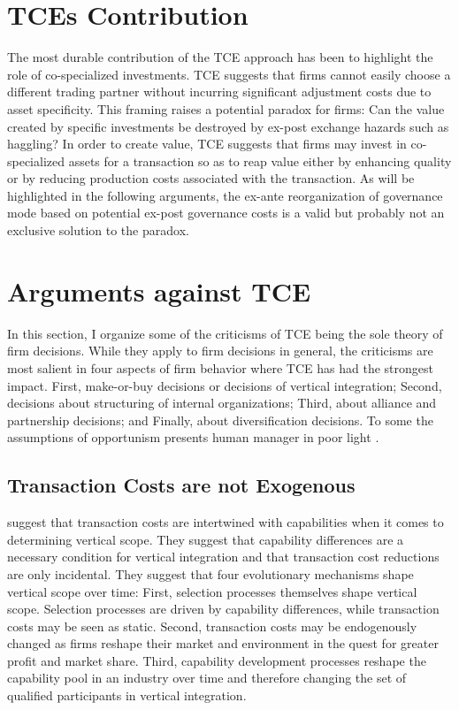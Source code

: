\documentclass[12pt,letterpaper]{article}
\begin{document}
\section{TCE\textquotesingle s Contribution}
The most durable contribution of the TCE approach has been to highlight the role of co-specialized investments. TCE suggests that firms cannot easily choose a different trading partner without incurring significant adjustment costs due to asset specificity. This framing raises a potential paradox for firms: Can the value created by specific investments be destroyed by ex-post exchange hazards such as haggling? In order to create value, TCE suggests that firms may invest in co-specialized assets for a transaction so as to reap value either by enhancing quality or by reducing production costs associated with the transaction. As will be highlighted in the following arguments, the ex-ante reorganization of governance mode based on potential ex-post governance costs is a valid but probably not an exclusive solution to the paradox.

\section{Arguments against TCE}
In this section, I organize some of the criticisms of TCE being the sole theory of firm decisions. While they apply to firm decisions in general, the criticisms are most salient in four aspects of firm behavior where TCE has had the strongest impact. First, make-or-buy decisions or decisions of vertical integration; Second, decisions about structuring of internal organizations; Third, about alliance and partnership decisions; and Finally, about diversification decisions. To some the assumptions of opportunism presents human manager in poor light \citep{Ghoshal1996}.

\subsection{Transaction Costs are not Exogenous}
\cite{Jacobides2005a} suggest that transaction costs are intertwined with capabilities when
it comes to determining vertical scope. They suggest that capability differences are a necessary
condition for vertical integration and that transaction cost reductions are only incidental. They
suggest that four evolutionary mechanisms shape vertical scope over time: First, selection processes
themselves shape vertical scope. Selection processes are driven by capability differences,
while transaction costs may be seen as static. Second, transaction costs may be endogenously changed as firms reshape their market and
environment in the quest for greater profit and market share.
Third, capability development processes reshape the capability pool in an industry over time
and therefore changing the set of qualified participants in vertical integration.
\end{document}
